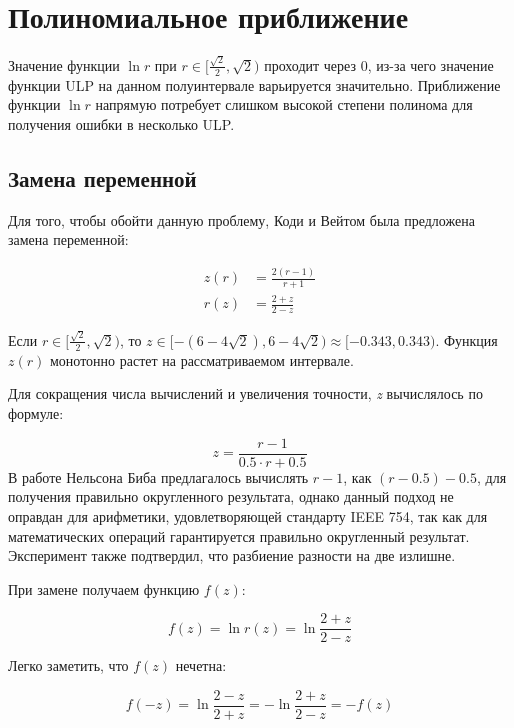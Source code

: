 \section{Полиномиальное приближение}
\label{sec:work:log:approx}

Значение функции $\ln{r}$ при $r \in [\frac{\sqrt{2}}{2}, \sqrt{2})$ проходит через 0, из-за чего значение функции ULP на данном полуинтервале варьируется значительно.
Приближение функции $\ln{r}$ напрямую потребует слишком высокой степени полинома для получения ошибки в несколько ULP.

\subsection{Замена переменной}

Для того, чтобы обойти данную проблему, Коди и Вейтом\cite{cody-waite} была предложена замена переменной:

\begin{align}
    z(r) &= \frac{2(r - 1)}{r+1} \\
    r(z) &= \frac{2 + z}{2 - z}
\end{align}

Если $r \in [\frac{\sqrt{2}}{2}, \sqrt{2})$, то $z \in [-(6 - 4\sqrt{2}), 6 - 4\sqrt{2}) \approx [-0.343, 0.343)$.
Функция $z(r)$ монотонно растет на рассматриваемом интервале.

Для сокращения числа вычислений и увеличения точности, \textit{z} вычислялось по формуле:

\begin{equation}
    z = \frac{r - 1}{0.5\cdot r + 0.5}
    \label{eq:log:var_impl}
\end{equation}
В работе Нельсона Биба\cite{beebe} предлагалось вычислять $r - 1$, как $(r - 0.5) - 0.5$, для получения правильно округленного результата, однако данный подход не оправдан для арифметики, удовлетворяющей стандарту IEEE 754\cite{ieee754}, так как для математических операций гарантируется правильно округленный результат.
Эксперимент также подтвердил, что разбиение разности на две излишне.


При замене получаем функцию $f(z)$:

\begin{equation}
    f(z) = \ln{r(z)} = \ln{\frac{2 + z}{2 - z}}
\end{equation}

Легко заметить, что $f(z)$ нечетна:

\begin{equation}
    f(-z) = \ln{\frac{2 - z}{2 + z}} = -\ln{\frac{2 + z}{2 - z}} = -f(z)
\end{equation}

